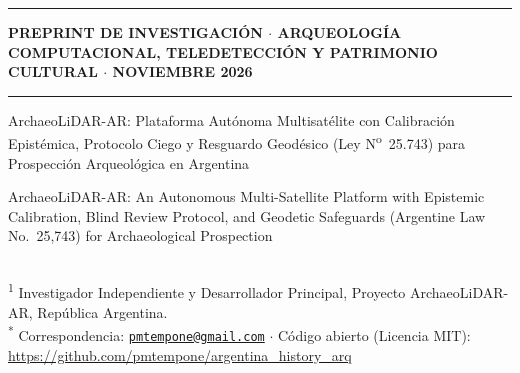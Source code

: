 \documentclass[11pt,a4paper]{article}
\DeclareRobustCommand{\_}{\ifmmode\mbox{\textunderscore}\else\textunderscore\allowbreak\fi}
\begin{document}
\thispagestyle{empty}
\noindent\rule{\linewidth}{2.0pt}
\vspace{-5pt}
\begin{center}
  {\footnotesize\bfseries\color{tealaccent} PREPRINT DE INVESTIGACI\'ON $\cdot$ ARQUEOLOG\'IA COMPUTACIONAL, TELEDETECCI\'ON Y PATRIMONIO CULTURAL $\cdot$ NOVIEMBRE 2026}
\end{center}
\vspace{-7pt}
\noindent\rule{\linewidth}{0.6pt}

\vspace{4pt}
{\LARGE\bfseries\color{navy}\raggedright
ArchaeoLiDAR-AR: Plataforma Aut\'onoma Multisat\'elite con Calibraci\'on Epist\'emica, Protocolo Ciego y Resguardo Geod\'esico (Ley N\textsuperscript{o}~25.743) para Prospecci\'on Arqueol\'ogica en Argentina\par}

\vspace{3pt}
{\normalsize\itshape\color{black!75}\raggedright
ArchaeoLiDAR-AR: An Autonomous Multi-Satellite Platform with Epistemic Calibration, Blind Review Protocol, and Geodetic Safeguards (Argentine Law No.\ 25,743) for Archaeological Prospection\par}

\vspace{6pt}
\\
{\small \textsuperscript{1} Investigador Independiente y Desarrollador Principal, Proyecto ArchaeoLiDAR-AR, Rep\'ublica Argentina.\\
\textsuperscript{*} Correspondencia: \href{mailto:pmtempone@gmail.com}{\texttt{pmtempone@gmail.com}} $\cdot$ C\'odigo abierto (Licencia MIT): \url{https://github.com/pmtempone/argentina_history_arq}}
\end{document}
